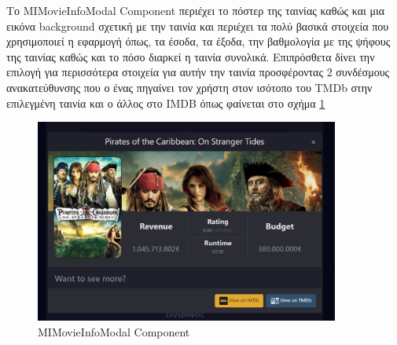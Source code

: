 
Το MIMovieInfoModal Component περιέχει το πόστερ της ταινίας καθώς και μια εικόνα background σχετική με την ταινία και περιέχει τα πολύ βασικά στοιχεία που χρησιμοποιεί η εφαρμογή όπως, τα έσοδα, τα έξοδα, την βαθμολογία με της ψήφους της ταινίας καθώς και το πόσο διαρκεί η ταινία συνολικά. Επιπρόσθετα δίνει την επιλογή για περισσότερα στοιχεία για αυτήν την ταινία προσφέροντας 2 συνδέσμους ανακατεύθυνσης που ο ένας πηγαίνει τον χρήστη στον ισότοπο του TMDb στην επιλεγμένη ταινία και ο άλλος στο IMDB όπως φαίνεται στο σχήμα \ref{layout:mimoviemodal}

\begin{figure}[H]
  \centering
  \includegraphics[width=100mm]{Chapters/5 - Architecture/Client/Images/mimoviemodal.png}
  \caption{MIMovieInfoModal Component}
  \label{layout:mimoviemodal}
\end{figure}